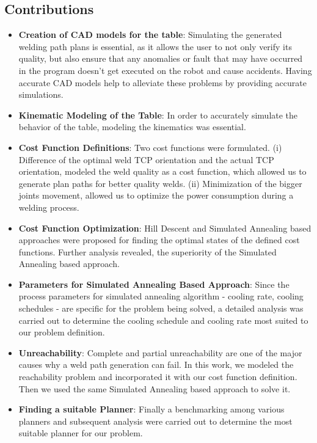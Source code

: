 \subsection{Contributions}
\begin{itemize}
	\item \textbf{Creation of CAD models for the table}: Simulating the generated welding path plans is essential, as it allows the user to not only verify its quality, but also ensure that any anomalies or fault that may have occurred in the program doesn't get executed on the robot and cause accidents. Having accurate CAD models help to alleviate these problems by providing accurate simulations. 
	\item \textbf{Kinematic Modeling of the Table}: In order to accurately simulate the behavior of the table, modeling the kinematics was essential. 
	\item \textbf{Cost Function Definitions}: Two cost functions were formulated. (i) Difference of the optimal weld TCP orientation and the actual TCP orientation, modeled the weld quality as a cost function, which allowed us to generate plan paths for better quality welds. (ii) Minimization of the bigger joints movement, allowed us to optimize the power consumption during a welding process.
	\item \textbf{Cost Function Optimization}: Hill Descent and Simulated Annealing based approaches were proposed for finding the optimal states of the defined cost functions. Further analysis revealed, the superiority of the Simulated Annealing based approach.
	\item \textbf{Parameters for Simulated Annealing Based Approach}: Since the process parameters for simulated annealing algorithm - cooling rate, cooling schedules - are specific for the problem being solved, a detailed analysis was carried out to determine the cooling schedule and cooling rate most suited to our problem definition.
	\item  \textbf{Unreachability}: Complete and partial unreachability are one of the major causes why a weld path generation can fail. In this work, we modeled the reachability problem and incorporated it with our cost function definition. Then we used the same Simulated Annealing based approach to solve it.
	\item \textbf{Finding a suitable Planner}: Finally a benchmarking among various planners and subsequent analysis were carried out to determine the most suitable planner for our problem.
\end{itemize}
